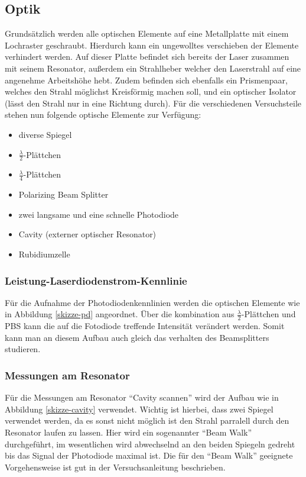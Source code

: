\documentclass[12pt]{article}
\begin{document}
\subsection{Optik}
Grundsätzlich werden alle optischen Elemente auf eine Metallplatte mit einem Lochraster geschraubt. Hierdurch kann ein ungewolltes verschieben der Elemente verhindert werden. Auf dieser Platte befindet sich bereits der Laser zusammen mit seinem Resonator, außerdem ein Strahlheber welcher den Laserstrahl auf eine angenehme Arbeitshöhe hebt. Zudem befinden sich ebenfalls ein Prismenpaar, welches den Strahl möglichst Kreisförmig machen soll, und ein optischer Isolator (lässt den Strahl nur in eine Richtung durch). Für die verschiedenen Versuchsteile stehen nun folgende optische Elemente zur Verfügung:
\begin{itemize}
 \item diverse Spiegel
 \item $\frac{\lambda}{2}$-Plättchen
 \item $\frac{\lambda}{4}$-Plättchen
 \item Polarizing Beam Splitter
 \item zwei langsame und eine schnelle Photodiode
 \item Cavity (externer optischer Resonator)
 \item Rubidiumzelle
\end{itemize}
\subsubsection{Leistung-Laserdiodenstrom-Kennlinie}
Für die Aufnahme der Photodiodenkennlinien werden die optischen Elemente wie in Abbildung \ref{skizze-pd} angeordnet.
Über die kombination aus $\frac{\lambda}{2}$-Plättchen und PBS kann die auf die Fotodiode treffende Intensität verändert werden. Somit kann man an diesem Aufbau auch gleich das verhalten des Beamsplitters studieren.
\subsubsection{Messungen am Resonator}
Für die Messungen am Resonator ``Cavity scannen'' wird der Aufbau wie in Abbildung \ref{skizze-cavity} verwendet. Wichtig ist hierbei, dass zwei Spiegel verwendet werden, da es sonst nicht möglich ist den Strahl parralell durch den Resonator laufen zu lassen. Hier wird ein sogenannter ``Beam Walk'' durchgeführt, im wesentlichen wird abwechselnd an den beiden Spiegeln gedreht bis das Signal der Photodiode maximal ist. Die für den ``Beam Walk'' geeignete Vorgehensweise ist gut in der Versuchsanleitung beschrieben.
\end{document}
